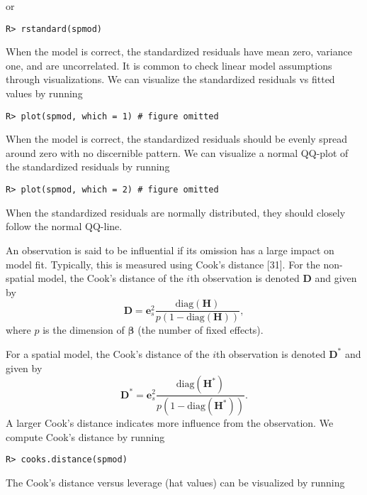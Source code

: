 \documentclass[10pt,letterpaper]{article}
\begin{document}
or

\begin{verbatim}
R> rstandard(spmod)
\end{verbatim}

When the model is correct, the standardized residuals have mean zero,
variance one, and are uncorrelated. It is common to check linear model
assumptions through visualizations. We can visualize the standardized
residuals vs fitted values by running

\begin{verbatim}
R> plot(spmod, which = 1) # figure omitted
\end{verbatim}

When the model is correct, the standardized residuals should be evenly
spread around zero with no discernible pattern. We can visualize a
normal QQ-plot of the standardized residuals by running

\begin{verbatim}
R> plot(spmod, which = 2) # figure omitted
\end{verbatim}

When the standardized residuals are normally distributed, they should
closely follow the normal QQ-line.

An observation is said to be influential if its omission has a large
impact on model fit. Typically, this is measured using Cook's distance
{[}31{]}. For the non-spatial model, the Cook's distance of the \(i\)th
observation is denoted \(\mathbf{D}\) and given by \begin{equation*}
  \mathbf{D} = \mathbf{e}_{s}^2 \frac{\text{diag}(\mathbf{H})}{p(1 - \text{diag}(\mathbf{H}))},
\end{equation*} where \(p\) is the dimension of \(\boldsymbol{\beta}\)
(the number of fixed effects).

For a spatial model, the Cook's distance of the \(i\)th observation is
denoted \(\mathbf{D}^*\) and given by \begin{equation*}
  \mathbf{D}^* = \mathbf{e}_{s}^2 \frac{\text{diag}(\mathbf{H}^*)}{p(1 - \text{diag}(\mathbf{H}^*))} .
\end{equation*} A larger Cook's distance indicates more influence from
the observation. We compute Cook's distance by running

\begin{verbatim}
R> cooks.distance(spmod)
\end{verbatim}

The Cook's distance versus leverage (hat values) can be visualized by
running
\end{document}
